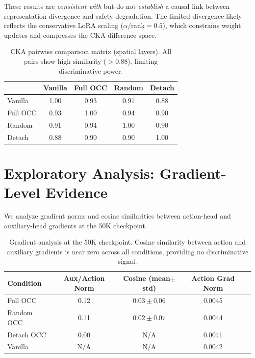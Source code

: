 \documentclass[letterpaper]{article}
\begin{document}
These results are \emph{consistent with} but do not \emph{establish} a causal link between representation divergence and safety degradation.
The limited divergence likely reflects the conservative LoRA scaling ($\alpha/\text{rank}=0.5$), which constrains weight updates and compresses the CKA difference space.

\begin{table}[h]
\centering
\caption{CKA pairwise comparison matrix (spatial layers). All pairs show high similarity ($>0.88$), limiting discriminative power.}
\label{tab:cka_pairwise}
\small
\begin{tabular}{lcccc}
\toprule
 & \textbf{Vanilla} & \textbf{Full OCC} & \textbf{Random} & \textbf{Detach} \\
\midrule
Vanilla  & 1.00 & 0.93 & 0.91 & 0.88 \\
Full OCC & 0.93 & 1.00 & 0.94 & 0.90 \\
Random   & 0.91 & 0.94 & 1.00 & 0.90 \\
Detach   & 0.88 & 0.90 & 0.90 & 1.00 \\
\bottomrule
\end{tabular}
\end{table}


\section{Exploratory Analysis: Gradient-Level Evidence}
\label{app:gradient}

We analyze gradient norms and cosine similarities between action-head and auxiliary-head gradients at the 50K checkpoint.

\begin{table}[h]
\centering
\caption{Gradient analysis at the 50K checkpoint. Cosine similarity between action and auxiliary gradients is near zero across all conditions, providing no discriminative signal.}
\label{tab:gradient}
\small
\begin{tabular}{lcccc}
\toprule
\textbf{Condition} & \textbf{Aux/Action Norm} & \textbf{Cosine (mean$\pm$std)} & \textbf{Action Grad Norm} \\
\midrule
Full OCC   & 0.12 & $0.03 \pm 0.06$ & 0.0045 \\
Random OCC & 0.11 & $0.02 \pm 0.07$ & 0.0044 \\
Detach OCC & 0.00 & N/A              & 0.0041 \\
Vanilla    & N/A  & N/A              & 0.0042 \\
\bottomrule
\end{tabular}
\end{table}
\end{document}
